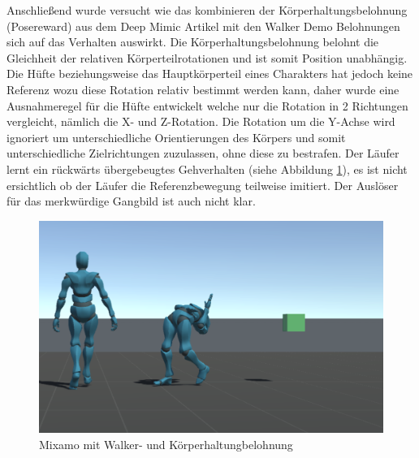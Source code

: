 Anschließend wurde versucht wie das kombinieren der Körperhaltungsbelohnung (Posereward) aus dem Deep Mimic Artikel mit den Walker Demo Belohnungen sich auf das Verhalten auswirkt. Die Körperhaltungsbelohnung belohnt die Gleichheit der relativen Körperteilrotationen und ist somit Position unabhängig. Die Hüfte beziehungsweise das Hauptkörperteil eines Charakters hat jedoch keine Referenz wozu diese Rotation relativ bestimmt werden kann, daher wurde eine Ausnahmeregel für die Hüfte entwickelt welche nur die Rotation in 2 Richtungen vergleicht, nämlich die X- und Z-Rotation. Die Rotation um die Y-Achse wird ignoriert um unterschiedliche Orientierungen des Körpers und somit unterschiedliche Zielrichtungen zuzulassen, ohne diese zu bestrafen. Der Läufer lernt ein rückwärts übergebeugtes Gehverhalten (siehe Abbildung \ref{fig:charakter_mixamo_imitation}), es ist nicht ersichtlich ob der Läufer die Referenzbewegung teilweise imitiert. Der Auslöser für das merkwürdige Gangbild ist auch nicht klar.

\begin{figure}[H]
  \centering  
  \includegraphics[width=\textwidth]{img/charakter_mixamo_imitation}
  \caption{Mixamo mit Walker- und Körperhaltungbelohnung}
  \label{fig:charakter_mixamo_imitation}
\end{figure}